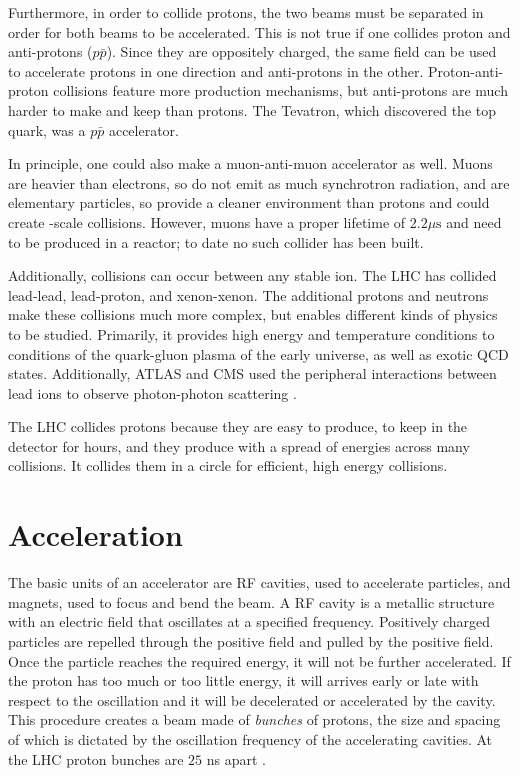 Furthermore, in order to collide protons, the two beams must be separated in order for both beams to be accelerated. This is not true if one collides proton and anti-protons ($p\bar{p}$). Since they are oppositely charged, the same field can be used to accelerate protons in one direction and anti-protons in the other. Proton-anti-proton collisions feature more production mechanisms, but anti-protons are much harder to make and keep than protons. The Tevatron, which discovered the top quark, was a $p\bar{p}$ accelerator. 

In principle, one could also make a muon-anti-muon accelerator as well. Muons are heavier than electrons, so do not emit as much synchrotron radiation, and are elementary particles, so provide a cleaner environment than protons and could create \TeV-scale collisions. However, muons have a proper lifetime of $2.2 \mu\textrm{s}$ and need to be produced in a reactor; to date no such collider has been built. 

Additionally, collisions can occur between any stable ion. The \ac{LHC} has collided lead-lead, lead-proton, and xenon-xenon. The additional protons and neutrons make these collisions much more complex, but enables different kinds of physics to be studied. Primarily, it provides high energy and temperature conditions to conditions of the quark-gluon plasma of the early universe, as well as exotic \ac{QCD} states. Additionally, \ac{ATLAS} and \ac{CMS} used the peripheral interactions between lead ions to observe photon-photon scattering \cite{light-light-scattering}.

The \ac{LHC} collides protons because they are easy to produce, to keep in the detector for hours, and they produce with a spread of energies across many collisions. It collides them in a circle for efficient, high energy collisions. 

\section{Acceleration}
The basic units of an accelerator are \ac{RF} cavities, used to accelerate particles, and magnets, used to focus and bend the beam. A \ac{RF} cavity is a metallic structure with an electric field that oscillates at a specified frequency. Positively charged particles are repelled through the positive field and pulled by the positive field. Once the particle reaches the required energy, it will not be further accelerated. If the proton has too much or too little energy, it will arrives early or late with respect to the oscillation and it will be decelerated or accelerated by the cavity. This procedure creates a beam made of \emph{bunches} of protons, the size and spacing of which is dictated by the oscillation frequency of the accelerating cavities. At the \ac{LHC} proton bunches are $25$ ns apart \cite{cern-cavities}.


